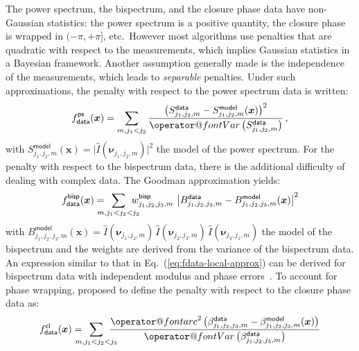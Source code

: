 \documentclass{article}
\makeatletter
\newcommand{\MathFunc}[1]{\mathop{\operator@font #1}\nolimits}
\newcommand{\Tag}[1]{\mathsf{#1}}        %
\newcommand{\V}[1]{\boldsymbol{#1}}      %
\newcommand{\FT}[1]{\hat{#1}}            %
\newcommand{\arc}{\MathFunc{arc}}        %
\newcommand{\Var}{\MathFunc{Var}}        %
\newcommand{\Paren}[1]{\left(#1\right)}
\newcommand{\abs}[1]{\vert #1\vert}
\newcommand{\Abs}[1]{\left\vert #1\right\vert}
\newcommand{\etc}{etc.\xspace}
\newcommand{\wrt}{with respect to\xspace}
\newcommand{\Eq}[1]{Eq.~(\ref{#1})}
\newcommand{\Powerspectrum}{S}
\newcommand{\Bispectrum}{B}
\newcommand{\PhaseClosure}{\beta}
\newcommand{\Freq}{\nu}               %
\newcommand{\VFreq}{\V{\Freq}}
\newcommand{\Image}{I}
\newcommand{\Param}{x}
\newcommand{\VParam}{\V{\Param}}
\newcommand{\DataTag}{\Tag{data}}
\newcommand{\ModelTag}{\Tag{model}}
\newcommand{\PowerspectrumTag}{\Tag{ps}}
\newcommand{\BispectrumTag}{\Tag{bisp}}
\newcommand{\PhaseClosureTag}{\Tag{cl}}
\newcommand{\Fcost}{f}
\newcommand{\Fdata}{\Fcost_\DataTag}
\makeatother
\begin{document}
The power spectrum, the bispectrum, and the closure phase data have
non-Gaussian statistics: the power spectrum is a positive quantity, the
closure phase is wrapped in $(-\pi,+\pi]$, \etc\ However most algorithms use
penalties that are quadratic \wrt the measurements, which implies Gaussian
statistics in a Bayesian framework.  Another assumption generally made is the
independence of the measurements, which leads to \emph{separable} penalties.
Under such approximations, the penalty \wrt the power spectrum data is
written:
\begin{equation}
  \label{eq:powerspectrum-penalty}
  \Fdata^\PowerspectrumTag(\VParam) = \sum_{m, j_1 < j_2}
  \frac{  \Paren{\Powerspectrum_{j_1,j_2,m}^\DataTag
   - \Powerspectrum_{j_1,j_2,m}^\ModelTag(\VParam)}^2
  }{\Var\Paren{\Powerspectrum_{j_1,j_2,m}^\DataTag}} \, ,
\end{equation}
with $\Powerspectrum_{j_1,j_2,m}^\ModelTag(\VParam) =
\abs{\FT{\Image}(\VFreq_{j_1,j_2,m})}^2$ the model of the power spectrum.  For
the penalty \wrt the bispectrum data, there is the additional difficulty
of dealing with complex data.  The Goodman approximation
\citep{Goodman-statistical_optics} yields:
\begin{equation}
  \label{eq:bispectrum-penalty}
  \Fdata^\BispectrumTag(\VParam) =
  \hspace{-1em}\sum_{m, j_1 < j_2 < j_3}\hspace{-1em}
  w^\BispectrumTag_{j_1,j_2,j_3,m}\,
  \Abs{\Bispectrum_{j_1,j_2,j_3,m}^\DataTag
   - \Bispectrum_{j_1,j_2,j_3,m}^\ModelTag(\VParam)}^2
\end{equation}
with $\Bispectrum_{j_1,j_2,j_3,m}^\ModelTag(\VParam) =
\FT{\Image}(\VFreq_{j_1,j_2,m}) \, \FT{\Image}(\VFreq_{j_2,j_3,m}) \,
\FT{\Image}(\VFreq_{j_3,j_1,m})$ the model of the bispectrum and the weights
are derived from the variance of the bispectrum data.  An expression similar
to that in \Eq{eq:fdata-local-approx} can be derived for bispectrum data with
independent modulus and phase errors~\citep{Meimon_et_al-2009-selfcal}.  To
account for phase wrapping, \citet{Haniff1991} proposed to define the penalty
\wrt the closure phase data as:
\begin{equation}
  \label{eq:Haniff-phase-closure-penalty}
  \Fdata^\PhaseClosureTag(\VParam) =
  \hspace{-1em}\sum_{m, j_1 < j_2 < j_3}\hspace{-1em}
  \frac{
    \arc^2\Paren{\PhaseClosure_{j_1,j_2,j_3,m}^\DataTag
   - \PhaseClosure_{j_1,j_2,j_3,m}^\ModelTag(\VParam)}
  }{\Var\Paren{\PhaseClosure_{j_1,j_2,j_3,m}^\DataTag}}
\end{equation}
\end{document}
